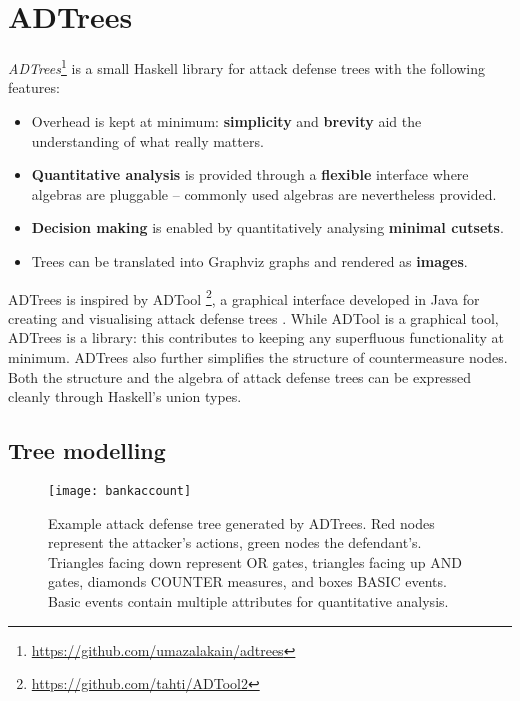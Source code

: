 \documentclass{scrreprt}
\begin{document}
\section{ADTrees}

\textit{ADTrees}\footnote{\url{https://github.com/umazalakain/adtrees}}
is a small Haskell library for attack defense trees with the following features:

\begin{itemize}
    \item Overhead is kept at minimum: \textbf{simplicity} and \textbf{brevity}
        aid the understanding of what really matters.
    \item \textbf{Quantitative analysis} is provided through a \textbf{flexible}
        interface where algebras are pluggable -- commonly used algebras are
        nevertheless provided.
    \item \textbf{Decision making} is enabled by quantitatively analysing
        \textbf{minimal cutsets}.
    \item Trees can be translated into Graphviz graphs and rendered as
        \textbf{images}.
\end{itemize}

ADTrees is inspired by ADTool \footnote{\url{https://github.com/tahti/ADTool2}},
a graphical interface developed in Java for creating and visualising attack
defense trees \cite{KordyTool}. While ADTool is a graphical tool, ADTrees is a
library: this contributes to keeping any superfluous functionality at minimum.
ADTrees also further simplifies the structure of countermeasure nodes. Both the
structure and the algebra of attack defense trees can be expressed cleanly
through Haskell's union types.

\subsection{Tree modelling}

\begin{figure}[h!]
    \label{example-adt}
    \centering
    \texttt{[image: bankaccount]}
    \caption{Example attack defense tree generated by ADTrees. Red nodes
    represent the attacker's actions, green nodes the defendant's. Triangles
    facing down represent OR gates, triangles facing up AND gates, diamonds
    COUNTER measures, and boxes BASIC events.  Basic events contain multiple
    attributes for quantitative analysis.}
\end{figure}
\end{document}
